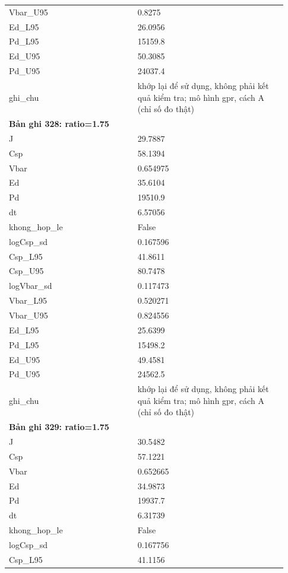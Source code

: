 \begin{longtable}{p{0.43\linewidth}p{0.50\linewidth}}
Vbar\_\allowbreak U95 & 0.8275 \\
Ed\_\allowbreak L95 & 26.0956 \\
Pd\_\allowbreak L95 & 15159.8 \\
Ed\_\allowbreak U95 & 50.3085 \\
Pd\_\allowbreak U95 & 24037.4 \\
ghi\_\allowbreak chu & khớp lại để sử dụng, không phải kết quả kiểm tra; mô hình gpr, cách A (chỉ số đo thật) \\
\midrule
\multicolumn{2}{p{0.95\linewidth}}{\textbf{Bản ghi 328: ratio=1.75}} \\
J & 29.7887 \\
Csp & 58.1394 \\
Vbar & 0.654975 \\
Ed & 35.6104 \\
Pd & 19510.9 \\
dt & 6.57056 \\
khong\_\allowbreak hop\_\allowbreak le & False \\
logCsp\_\allowbreak sd & 0.167596 \\
Csp\_\allowbreak L95 & 41.8611 \\
Csp\_\allowbreak U95 & 80.7478 \\
logVbar\_\allowbreak sd & 0.117473 \\
Vbar\_\allowbreak L95 & 0.520271 \\
Vbar\_\allowbreak U95 & 0.824556 \\
Ed\_\allowbreak L95 & 25.6399 \\
Pd\_\allowbreak L95 & 15498.2 \\
Ed\_\allowbreak U95 & 49.4581 \\
Pd\_\allowbreak U95 & 24562.5 \\
ghi\_\allowbreak chu & khớp lại để sử dụng, không phải kết quả kiểm tra; mô hình gpr, cách A (chỉ số đo thật) \\
\midrule
\multicolumn{2}{p{0.95\linewidth}}{\textbf{Bản ghi 329: ratio=1.75}} \\
J & 30.5482 \\
Csp & 57.1221 \\
Vbar & 0.652665 \\
Ed & 34.9873 \\
Pd & 19937.7 \\
dt & 6.31739 \\
khong\_\allowbreak hop\_\allowbreak le & False \\
logCsp\_\allowbreak sd & 0.167756 \\
Csp\_\allowbreak L95 & 41.1156 \\

\end{longtable}
